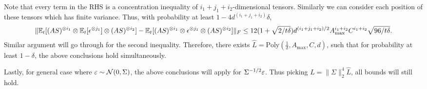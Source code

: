 Note that every term in the RHS is a concentration inequality of $i_1+j_1+i_2$-dimensional tensors. Similarly we can consider each position of these tensors which has finite variance.
Thus, with probability at least $1- 4d^{(i_1+j_1+i_2)}\delta$,   
\[
\|\mathbb{E}_t[(AS)^{\otimes i_1}\otimes \mathbb{E}_t[\epsilon^{\otimes j_1}] \otimes (AS)^{\otimes i_2}] - \mathbb{E}_t[(AS)^{\otimes i_1}\otimes \epsilon^{\otimes j_1}\otimes (AS)^{\otimes i_2}]  \|_F 
\le
12(1+\sqrt{2/t\delta})d^{(i_1+j_1+i_2)/2}A_{\max}^{i_1+i_2}C^{i_1+i_2}\sqrt{96/t\delta}.  
\]
Similar argument will go through for the second inequality.
Therefore, there exists $\hat{L} = \text{Poly}(\frac{1}{\delta}, A_{\max}, C, d)$, such that for probability at least $1-\delta$, the above conclusions hold simultaneously.

Lastly, for general case where $\varepsilon\sim {\cal{N}}(0,\Sigma)$, the above conclusions will apply for $\Sigma^{-1/2}\varepsilon$. Thus picking $L = \|\Sigma\|^4_2\hat{L}$, all bounds will still hold. 
